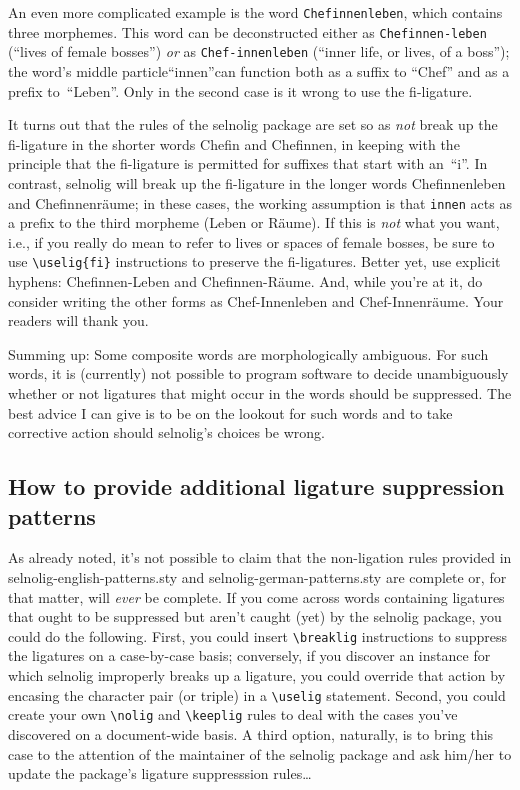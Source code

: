 \documentclass[11pt]{article}
\newcommand{\pkg}[1]{\textsf{#1}}
\newcommand{\opt}[1]{\texttt{#1}}
\newcommand{\cmmd}[1]{\texttt{\textbackslash #1}}
\begin{document}
An even more complicated example is the word \opt{Chefinnenleben}, which contains three morphemes. This word can be deconstructed either as \opt{Chefinnen-leben} (\enquote{lives of female bosses}) \emph{or} as \opt{Chef-innenleben} (\enquote{inner life, or lives, of a boss}); the word's middle particle\textemdash\enquote{innen}\textemdash can function both as a suffix to \enquote{Chef} and as a prefix to~\enquote{Leben}. Only in the second case is it wrong to use the fi-ligature. 

It turns out that the rules of the \pkg{selnolig} package are set so as \emph{not} break up the fi-ligature in the shorter words Chefin and Chefinnen, in keeping with the principle that the fi-ligature is permitted for suffixes that start with an~\enquote{i}. In contrast, \pkg{selnolig} will break up the fi-ligature in the longer words Chefinnenleben and Chefinnenräume; in these cases, the working assumption is that \opt{innen} acts as a prefix to the third morpheme (Leben or Räume). If this is \emph{not} what you want, i.e., if you really do mean to refer to lives or spaces of female bosses, be sure to use \Verb+\uselig{fi}+ instructions to preserve the fi-ligatures. Better yet, use explicit hyphens: Chefinnen-Leben and Chefinnen-Räume. And, while you're at it, do consider writing the other forms as Chef-Innenleben and Chef-Innenräume. Your readers will thank you.

Summing up: Some composite words are morphologically ambiguous. For such words, it is (currently) not possible to program software to decide unambiguously whether or not ligatures that might occur in the words should be suppressed. The best advice I can give is to be on the lookout for such words and to take corrective action should \pkg{selnolig}'s choices be wrong.



\subsection{How to provide additional ligature suppression patterns}

As already noted, it's not possible to claim that the non-ligation rules provided in \pkg{selnolig-english-patterns.sty} and \pkg{selnolig-german-patterns.sty} are complete or, for that matter, will \emph{ever} be complete. If you come across words containing ligatures that ought to be suppressed but aren't caught (yet) by the \pkg{selnolig} package, you could do the following. First, you could insert \cmmd{breaklig} instructions to suppress the ligatures on a case-by-case basis; conversely, if you discover an instance for which \pkg{selnolig} improperly breaks up a ligature, you could override that action by encasing the character pair (or triple) in a \cmmd{uselig} statement. Second, you could create your own \cmmd{nolig} and \cmmd{keeplig} rules to deal with the cases you've discovered on a document-wide basis. A third option, naturally, is to bring this case to the attention of the maintainer of the \pkg{selnolig} package and ask him/her to update the package's ligature suppresssion rules\dots
\end{document}
